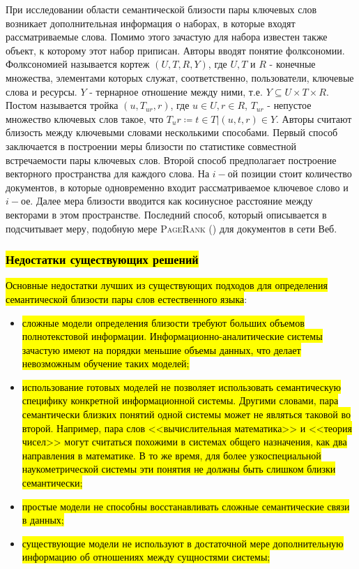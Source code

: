 При исследовании области семантической близости пары ключевых слов возникает дополнительная информация о наборах, в которые входят рассматриваемые слова. Помимо этого зачастую для набора известен также объект, к которому этот набор приписан. Авторы \cite{folk} вводят понятие фолксономии. Фолксономией называется кортеж $(U, T, R, Y)$, где $U,T$ и $R$ - конечные множества, элементами которых служат, соответственно, пользователи, ключевые слова и ресурсы. $Y$ - тернарное отношение между ними, т.е. $Y  \subseteq U \times T \times R$. Постом называется тройка $(u, T_{ur}, r)$, где $u \in U, r \in R$, $T_{ur}$ - непустое множество ключевых слов такое, что $T_ur  \coloneqq {t \in T | (u, t, r) \in Y}$. Авторы \cite{folk_2} считают близость между ключевыми словами несколькими способами. Первый способ заключается в построении меры близости по статистике совместной встречаемости пары ключевых слов. Второй способ предполагает построение векторного пространства для каждого слова. На $i-$ой позиции стоит количество документов, в которые одновременно входит рассматриваемое ключевое слово и $i-$ое. Далее мера близости вводится как косинусное расстояние между векторами в этом пространстве. Последний способ, который описывается в \cite{folk} подсчитывает меру, подобную мере \textsc{PageRank} (\cite{pagerank}) для документов в сети Веб.

\subsubsection{\hl{Недостатки существующих решений}}
\hl{Основные недостатки лучших из существующих подходов для определения семантической близости пары слов естественного языка}:
\begin{itemize}
    \item \hl{сложные модели определения близости требуют больших объемов полнотекстовой информации. Информационно-аналитические системы зачастую имеют на порядки меньшие объемы данных, что делает невозможным обучение таких моделей;}
    \item \hl{использование готовых моделей не позволяет использовать семантическую специфику конкретной информационной системы. Другими словами, пара семантически близких понятий одной системы может не являться таковой во второй. Например, пара слов <<вычислительная математика>> и <<теория чисел>> могут считаться похожими в системах общего назначения, как два направления в математике. В то же время, для более узкоспециальной наукометрической системы эти понятия не должны быть слишком близки семантически;}
    \item \hl{простые модели не способны восстанавливать сложные семантические связи в данных;}
    \item \hl{существующие модели не используют в достаточной мере дополнительную информацию об отношениях между сущностями системы;}
\end{itemize}


